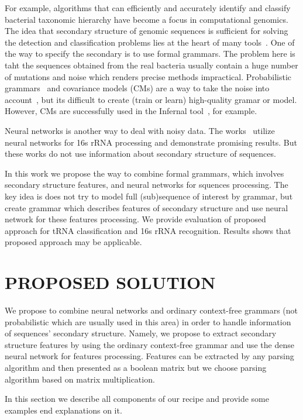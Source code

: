 \documentclass[a4paper,twoside]{article}
\begin{document}
For example, algorithms that can efficiently and accurately identify and classify bacterial taxonomic hierarchy have become a focus in computational genomics.
The idea that secondary structure of genomic sequences is sufficient for solving the detection and classification problems lies at the heart of many tools~\cite{GrammarsRNA,PCFG,meta,LWPCFG}.
One of the way to specify the secondary is to use formal grammars. 
The problem here is taht the sequences obtained from the real bacteria usually contain a huge number of mutations and noise which renders precise methods impractical. 
Probabilistic grammars~\cite{!!!} and covariance models (CMs) are a way to take the noise into account~\cite{EddyDurbin}, but its difficult to create (train or learn) high-quality gramar or model.
However, CMs are successfully used in the Infernal tool~\cite{Infernal}, for example.

Neural networks is another way to deal with noisy data. 
The works~\cite{Humidor,ANN} utilize neural networks for 16s rRNA processing and demonstrate promising results.
But these works do not use information about secondary structure of sequences.

In this work we propose the way to combine formal grammars, which involves secondary structure features, and neural networks for squences processing.
The key idea is does not try to model full (sub)sequence of interest by grammar, but create grammar which describes features of secondary structure and use neural network for these features processing.
We provide evaluation of proposed approach for tRNA classification and 16s rRNA recognition.
Results shows that proposed approach may be applicable.

\section{\uppercase{Proposed solution}}
\label{sec:proposedSolution}

\noindent We propose to combine neural networks and ordinary context-free grammars (not probabilistic which are usually used in this area) in order to handle information of sequences' secondary structure. 
Namely, we propose to extract secondary structure features by using the ordinary context-free grammar and use the dense neural network for features processing.
Features can be extracted by any parsing algorithm and then presented as a boolean matrix but we choose parsing algorithm based on matrix multiplication.

In this section we describe all components of our recipe and provide some examples end explanations on it.
 
\end{document}
